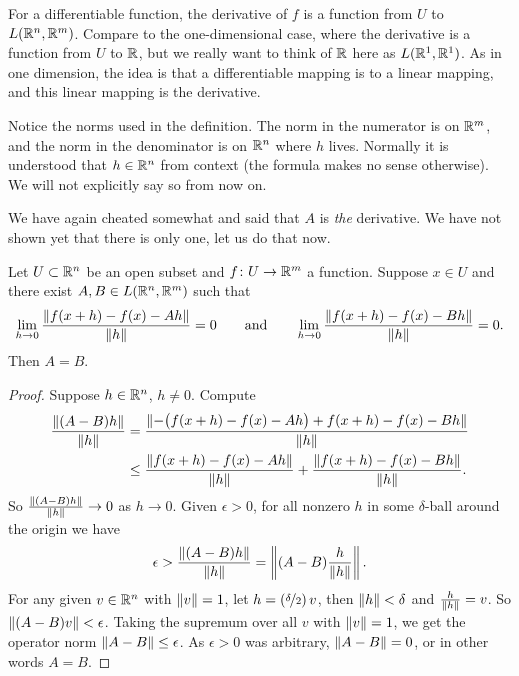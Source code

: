 For a differentiable function,
the derivative of $f$ is a function from $U$ to $L({\mathbb{R}}^n,{\mathbb{R}}^m)$.  Compare
to the one-dimensional case, where the derivative is a function
from $U$ to ${\mathbb{R}}$, but we really want to think of ${\mathbb{R}}$ here as
$L({\mathbb{R}}^1,{\mathbb{R}}^1)$.  As in one dimension, the idea is that a differentiable
mapping is  to a linear mapping, and this
linear mapping is the derivative.

Notice the norms used in the definition.
The norm in the
numerator is on ${\mathbb{R}}^m$, and the norm in the denominator is on ${\mathbb{R}}^n$ where $h$
lives.
Normally it is understood that $h \in {\mathbb{R}}^n$ from context
(the formula makes no sense otherwise).
We will not explicitly say so from now on.

We have again cheated somewhat and said that $A$
is \emph{the} derivative.  We have not shown yet that there
is only one, let us do that now.

\begin{prop}
Let $U \subset {\mathbb{R}}^n$ be an open subset and $f \colon U \to {\mathbb{R}}^m$ a function.  Suppose
$x \in U$ and there exist 
$A,B \in L({\mathbb{R}}^n,{\mathbb{R}}^m)$ such that
\begin{equation*}
\lim_{h \to 0}
\frac{\lVert {f(x+h)-f(x) - Ah} \rVert}{\lVert {h} \rVert} = 0
\qquad \text{and} \qquad
\lim_{h \to 0}
\frac{\lVert {f(x+h)-f(x) - Bh} \rVert}{\lVert {h} \rVert} = 0 .
\end{equation*}
Then $A=B$.
\end{prop}

\begin{proof}
Suppose $h \in {\mathbb{R}}^n$, $h \not= 0$.  Compute
\begin{equation*}
\begin{split}
\frac{\lVert {(A-B)h} \rVert}{\lVert {h} \rVert} & =
\frac{\lVert {-\bigl(f(x+h)-f(x) - Ah\bigr) + f(x+h)-f(x) - Bh} \rVert}{\lVert {h} \rVert} \\
& \leq
\frac{\lVert {f(x+h)-f(x) - Ah} \rVert}{\lVert {h} \rVert} + \frac{\lVert {f(x+h)-f(x) -
Bh} \rVert}{\lVert {h} \rVert} .
\end{split}
\end{equation*}
So 
$\frac{\lVert {(A-B)h} \rVert}{\lVert {h} \rVert} \to 0$ as $h \to 0$.  Given
$\epsilon > 0$, for all nonzero $h$ in some $\delta$-ball around
the origin we have
\begin{equation*}
\epsilon > 
\frac{\lVert {(A-B)h} \rVert}{\lVert {h} \rVert}
=
\left\lVert {(A-B)\frac{h}{\lVert {h} \rVert}} \right\rVert .
\end{equation*}
For any given $v \in {\mathbb{R}}^n$ with $\lVert {v} \rVert=1$,
let $h = (\nicefrac{\delta}{2}) \, v$, then $\lVert {h} \rVert < \delta$
and $\frac{h}{\lVert {h} \rVert} = v$.
So $\lVert {(A-B)v} \rVert < \epsilon$.  Taking the supremum over all $v$ with
$\lVert {v} \rVert = 1$, we get the operator norm
$\lVert {A-B} \rVert \leq \epsilon$.  As $\epsilon > 0$
was arbitrary, $\lVert {A-B} \rVert = 0$, or in other words $A = B$.
\end{proof}

